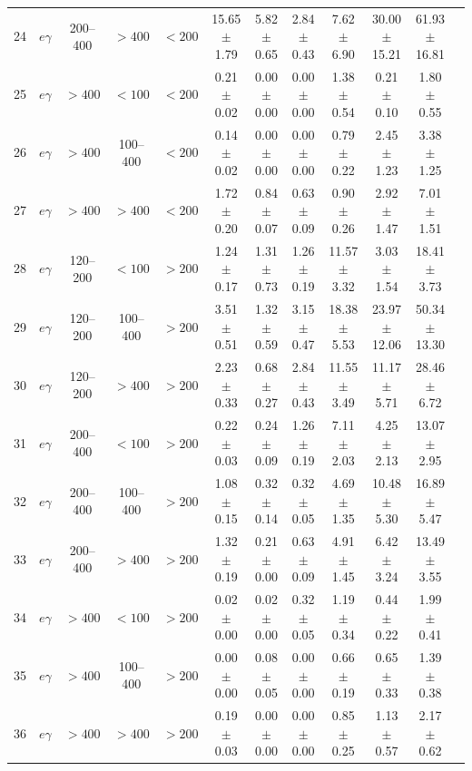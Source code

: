 \begin{table}[htbp]
{\begin{tabular}{|c|c|c|c|c|c|c|c|c|c|c|c|}
24 & $e\gamma$ & 200--400 & $>400$ & $<200$ & 15.65 $\pm$ 1.79 & 5.82 $\pm$ 0.65 & 2.84 $\pm$ 0.43 & 7.62 $\pm$ 6.90 & 30.00 $\pm$ 15.21 & 61.93 $\pm$ 16.81 &  \\
25 & $e\gamma$ & $>400$ & $<100$ & $<200$ & 0.21 $\pm$ 0.02 & 0.00 $\pm$ 0.00 & 0.00 $\pm$ 0.00 & 1.38 $\pm$ 0.54 & 0.21 $\pm$ 0.10 & 1.80 $\pm$ 0.55 &  \\
26 & $e\gamma$ & $>400$ & 100--400 & $<200$ & 0.14 $\pm$ 0.02 & 0.00 $\pm$ 0.00 & 0.00 $\pm$ 0.00 & 0.79 $\pm$ 0.22 & 2.45 $\pm$ 1.23 & 3.38 $\pm$ 1.25 &  \\
27 & $e\gamma$ & $>400$ & $>400$ & $<200$ & 1.72 $\pm$ 0.20 & 0.84 $\pm$ 0.07 & 0.63 $\pm$ 0.09 & 0.90 $\pm$ 0.26 & 2.92 $\pm$ 1.47 & 7.01 $\pm$ 1.51 &  \\
28 & $e\gamma$ & 120--200 & $<100$ & $>200$ & 1.24 $\pm$ 0.17 & 1.31 $\pm$ 0.73 & 1.26 $\pm$ 0.19 & 11.57 $\pm$ 3.32 & 3.03 $\pm$ 1.54 & 18.41 $\pm$ 3.73 &  \\
29 & $e\gamma$ & 120--200 & 100--400 & $>200$ & 3.51 $\pm$ 0.51 & 1.32 $\pm$ 0.59 & 3.15 $\pm$ 0.47 & 18.38 $\pm$ 5.53 & 23.97 $\pm$ 12.06 & 50.34 $\pm$ 13.30 &  \\
30 & $e\gamma$ & 120--200 & $>400$ & $>200$ & 2.23 $\pm$ 0.33 & 0.68 $\pm$ 0.27 & 2.84 $\pm$ 0.43 & 11.55 $\pm$ 3.49 & 11.17 $\pm$ 5.71 & 28.46 $\pm$ 6.72 &  \\
31 & $e\gamma$ & 200--400 & $<100$ & $>200$ & 0.22 $\pm$ 0.03 & 0.24 $\pm$ 0.09 & 1.26 $\pm$ 0.19 & 7.11 $\pm$ 2.03 & 4.25 $\pm$ 2.13 & 13.07 $\pm$ 2.95 &  \\
32 & $e\gamma$ & 200--400 & 100--400 & $>200$ & 1.08 $\pm$ 0.15 & 0.32 $\pm$ 0.14 & 0.32 $\pm$ 0.05 & 4.69 $\pm$ 1.35 & 10.48 $\pm$ 5.30 & 16.89 $\pm$ 5.47 &  \\
33 & $e\gamma$ & 200--400 & $>400$ & $>200$ & 1.32 $\pm$ 0.19 & 0.21 $\pm$ 0.00 & 0.63 $\pm$ 0.09 & 4.91 $\pm$ 1.45 & 6.42 $\pm$ 3.24 & 13.49 $\pm$ 3.55 &  \\
34 & $e\gamma$ & $>400$ & $<100$ & $>200$ & 0.02 $\pm$ 0.00 & 0.02 $\pm$ 0.00 & 0.32 $\pm$ 0.05 & 1.19 $\pm$ 0.34 & 0.44 $\pm$ 0.22 & 1.99 $\pm$ 0.41 &  \\
35 & $e\gamma$ & $>400$ & 100--400 & $>200$ & 0.00 $\pm$ 0.00 & 0.08 $\pm$ 0.05 & 0.00 $\pm$ 0.00 & 0.66 $\pm$ 0.19 & 0.65 $\pm$ 0.33 & 1.39 $\pm$ 0.38 &  \\
36 & $e\gamma$ & $>400$ & $>400$ & $>200$ & 0.19 $\pm$ 0.03 & 0.00 $\pm$ 0.00 & 0.00 $\pm$ 0.00 & 0.85 $\pm$ 0.25 & 1.13 $\pm$ 0.57 & 2.17 $\pm$ 0.62 &  \\
\hline
\end{tabular}}
\end{table}
